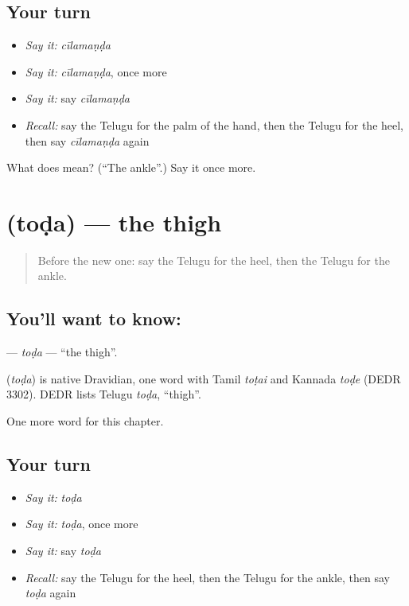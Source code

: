 \subsection*{Your turn}
\begin{itemize}
\raggedright
  \item \emph{Say it:} \emph{cīlamaṇḍa}
  \item \emph{Say it:} \emph{cīlamaṇḍa}, once more
  \item \emph{Say it:} say \emph{cīlamaṇḍa}
  \item \emph{Recall:} say the Telugu for the palm of the hand, then the Telugu for the heel, then say \emph{cīlamaṇḍa} again
\end{itemize}

\begin{tcolorbox}[breakable,colback=teal!4,colframe=teal!35!black,title={Before you move on}]
What does  mean? (\textquotedblleft{}The ankle\textquotedblright{}.) Say it once more.
\end{tcolorbox}
\section[\texorpdfstring{\te{తొడ} (toḍa)}{తొడ (toḍa)}]{ (toḍa) — the thigh}

\label{lesson:TE-C250-toda}



\begin{quote}
Before the new one: say the Telugu for the heel, then the Telugu for the ankle.
\end{quote}

\subsection*{You'll want to know: }
\textbf{} — \emph{toḍa} — \textquotedblleft{}the thigh\textquotedblright{}.

\begin{cousinweb}
\textbf{} (\emph{toḍa}) is native Dravidian, one word with Tamil \emph{toṭai} and Kannada \emph{toḍe} (DEDR 3302). DEDR lists Telugu \emph{toḍa}, \textquotedblleft{}thigh\textquotedblright{}.
\end{cousinweb}

\begin{grammarlens}[title={What you've built}]
One more word for this chapter.
\end{grammarlens}

\subsection*{Your turn}
\begin{itemize}
\raggedright
  \item \emph{Say it:} \emph{toḍa}
  \item \emph{Say it:} \emph{toḍa}, once more
  \item \emph{Say it:} say \emph{toḍa}
  \item \emph{Recall:} say the Telugu for the heel, then the Telugu for the ankle, then say \emph{toḍa} again
\end{itemize}

